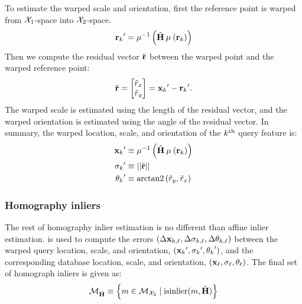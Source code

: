         To estimate the warped scale and orientation, first the reference
          point is warped from $\mathcal{X}_{1}$-space into $\mathcal{X}_{2}$-space.
        \begin{equation}
            {{\ensuremath{\mathbf{r}}_{k}}}' = \mathbin{\mu^{-1}}\left(\hat{\mathbf{H}} \mathbin{\mu}\left({\mathbf{r}_{k}}\right)\right)
        \end{equation}
        Then we compute the residual vector $\tilde{\mathbf{r}}$ between the warped point and the warped reference point:
        \begin{equation}
            \tilde{\mathbf{r}} = \begin{bmatrix} \tilde{r}_x \\ \tilde{r}_y \end{bmatrix} = {{\mathbf{x}_{k}}}'- {{\mathbf{r}_{k}}}'.
        \end{equation}
        The warped scale is estimated using the length of the residual vector, and the warped orientation is
          estimated using the angle of the residual vector.
        In summary, the warped location, scale, and orientation of the $k^{\textrm{th}}{}$ query feature is:
        \begin{equation}\label{eqn:homogwarp}
            \begin{aligned}
                {{\ensuremath{\mathbf{x}}_{k}}}'      &\equiv \mathbin{\mu^{-1}}\left(\hat{\mathbf{H}} \mathbin{\mu}\left({\mathbf{r}_{k}}\right)\right) \\
                 {{\sigma_{k}}}'  &\equiv ||\tilde{\mathbf{r}}||_{}\\
                {{\theta_{k}}}'     &\equiv \mathbin{\operatorname{arctan2}}\left(\tilde{r}_y, \tilde{r}_x\right)
            \end{aligned}
        \end{equation}

        \subsubsection{Homography inliers}
        The rest of homography inlier estimation is no different than affine inlier estimation.
         is used to compute the errors $( %
        \Delta \pt_{\idxI, \idxII}, %
        \Delta \scale_{\idxI, \idxII}, %
        \Delta \ori_{\idxI, \idxII})$
        between the warped query location, scale, and orientation, $({{\mathbf{x}_{k}}}', {{\sigma_{k}}}', {{\theta_{k}}}')$, %
        and the corresponding database location, scale, and orientation, %
        $({{\mathbf{x}_{\ell}}}, {{\sigma_{\ell}}}, {{\theta_{\ell}}})$.
        The final set of homograph inliers is given as:
        \begin{equation}\label{eqn:homoginliers}
            \mathcal{M}_{\hat{\mathbf{H}}} \equiv \left\{m  \in \mathcal{M}_{\mathcal{X}_{2}} \mid \operatorname{isinlier}(m, \hat{\mathbf{H}})\right\}
        \end{equation}


